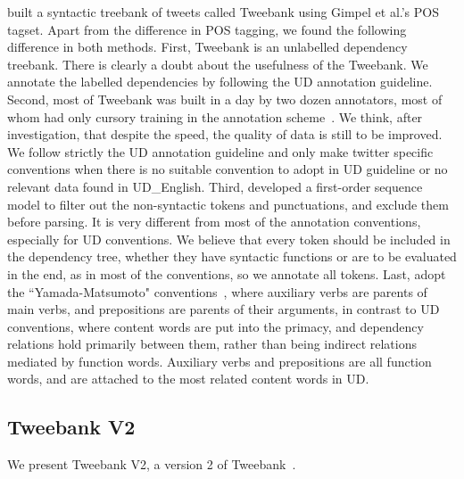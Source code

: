 \documentclass[11pt,letterpaper]{article}
\begin{document}
 built a syntactic treebank of tweets called Tweebank using Gimpel et al.'s POS tagset. 
Apart from the difference in POS tagging, we found the following difference in both methods.
First, Tweebank is an unlabelled dependency treebank. There is clearly a doubt about the usefulness of the Tweebank. We annotate the labelled dependencies by following the UD annotation guideline.
Second, most of Tweebank was built in a day by two dozen annotators, most of whom had only cursory training in the annotation scheme~\cite{kong-EtAl:2014:EMNLP2014}. We think, after investigation, that despite the speed, the quality of data is still to be improved. We follow strictly the UD annotation guideline and only make twitter specific conventions when there is no suitable convention to adopt in UD guideline or no relevant data found in UD\_English.
Third,  developed a first-order sequence model to filter out the non-syntactic tokens and punctuations, and exclude them before parsing.
It is very different from most of the annotation conventions, especially for UD conventions. We believe that every token should be included in the dependency tree, whether they have syntactic functions or are to be evaluated in the end, as in most of the conventions, so we annotate all tokens.
Last,  adopt the ``Yamada-Matsumoto" conventions~\cite{Yamada03statisticaldependency}, where auxiliary verbs are parents of main verbs, and prepositions are parents of their arguments, in contrast to UD conventions, where content words are put into the primacy, and dependency relations hold primarily between them, rather than being indirect relations mediated by function words. Auxiliary verbs and prepositions are all function words, and are attached to the most related content words in UD.



\subsection{Tweebank V2}
We present Tweebank V2, a version 2 of Tweebank~\cite{kong-EtAl:2014:EMNLP2014}.
\end{document}
